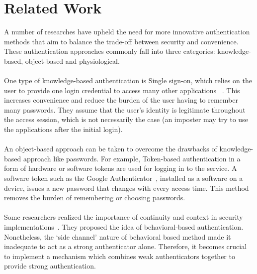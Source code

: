 \documentclass[a4paper, 11pt]{article}
\begin{document}
\section*{Related Work}
A number of researches have upheld the need for more innovative authentication methods that aim to balance the trade-off between security and convenience. These authentication approaches commonly fall into three categories: knowledge-based, object-based and physiological.\\\\
\noindent
One type of knowledge-based authentication is Single sign-on, which relies on the user to provide one login credential to access many other applications~\cite{Abdulwahid2016} . This increases convenience and reduce the burden of the user having to remember many passwords. They assume that the user’s identity is legitimate throughout the access session, which is not necessarily the case (an imposter may try to use the applications after the initial login). \\\\
\noindent
An object-based approach can be taken to overcome the drawbacks of knowledge-based approach like passwords. For example, Token-based authentication in a form of hardware or software tokens are used for logging in to the service. A software token such as the Google Authenticator~\cite{}, installed as a software on a device, issues a new password that changes with every access time. This method removes the burden of remembering or choosing passwords.\\\\
\noindent
Some researchers realized the importance of continuity and context in security implementations~\cite{Nakanishi:2016:UBC:3015166.3015180, Sitara:2016:DVT:3009206.3009228,https://calhoun.nps.edu/handle/10945/1011,Janakiraman:2005:UCF:1042449.1043974,ebb6df849f174c33bc9df41b799a296d}. They proposed the idea of behavioral-based authentication. Nonetheless, the ‘side channel’ nature of behavioral based method made it inadequate to act as a strong authenticator alone. Therefore, it becomes crucial to implement a mechanism which combines weak authenticators together to provide strong authentication.
\end{document}
